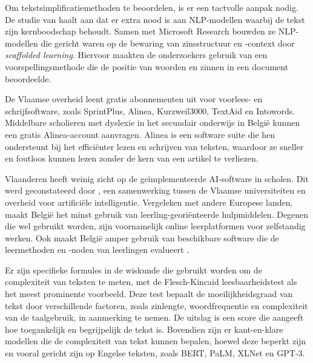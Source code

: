 Om tekstsimplificatiemethoden te beoordelen, is er een tactvolle aanpak nodig. De studie van \textcite{Swayamdipta2019} haalt aan dat er extra nood is aan NLP-modellen waarbij de tekst zijn kernboodschap behoudt. Samen met Microsoft Research bouwden ze NLP-modellen die gericht waren op de bewaring van zinsstructuur en -context door \emph{scaffolded learning}. Hiervoor maakten de onderzoekers gebruik van een voorspellingsmethode die de positie van woorden en zinnen in een document beoordeelde.

De Vlaamse overheid leent gratis abonnementen uit voor voorlees- en schrijfsoftware, zoals SprintPlus, Alinea, Kurzweil3000, TextAid en Intowords. Middelbare scholieren met dyslexie in het secundair onderwijs in België kunnen een gratis Alinea-account aanvragen. Alinea is een software suite die hen ondersteunt bij het efficiënter lezen en schrijven van teksten, waardoor ze sneller en foutloos kunnen lezen zonder de kern van een artikel te verliezen. 

Vlaanderen heeft weinig zicht op de geïmplementeerde AI-software in scholen. Dit werd geconstateerd door \autocite{Martens2021}, een samenwerking tussen de Vlaamse universiteiten en overheid voor artificiële intelligentie. Vergeleken met andere Europese landen, maakt België het minst gebruik van leerling-georiënteerde hulpmiddelen. Degenen die wel gebruikt worden, zijn voornamelijk online leerplatformen voor zelfstandig werken. Ook maakt België amper gebruik van beschikbare software die de leermethoden en -noden van leerlingen evalueert \autocite{Martens2021a}. 




Er zijn specifieke formules in de wiskunde die gebruikt worden om de complexiteit van teksten te meten, met de Flesch-Kincaid leesbaarheidstest als het meest prominente voorbeeld. Deze test bepaalt de moeilijkheidsgraad van tekst door verschillende factoren, zoals zinlengte, woordfrequentie en complexiteit van de taalgebruik, in aanmerking te nemen. De uitslag is een score die aangeeft hoe toegankelijk en begrijpelijk de tekst is. Bovendien zijn er kant-en-klare modellen die de complexiteit van tekst kunnen bepalen, hoewel deze beperkt zijn en vooral gericht zijn op Engelse teksten, zoals BERT, PaLM, XLNet en GPT-3.

